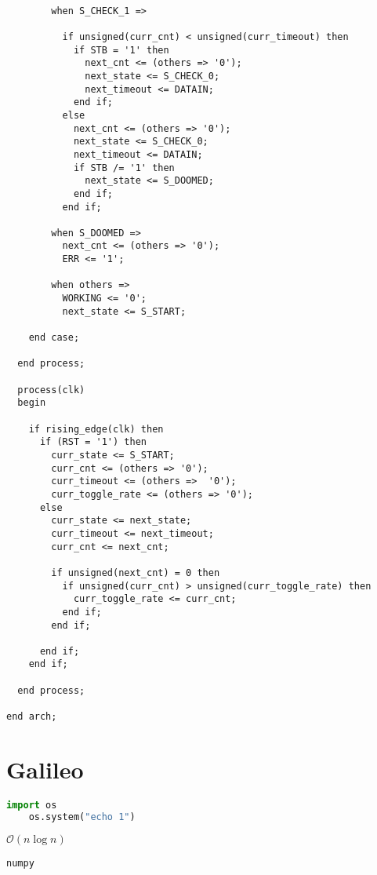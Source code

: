 \begin{lstlisting}[style=vhdl]
  
        when S_CHECK_1 =>
  
          if unsigned(curr_cnt) < unsigned(curr_timeout) then
            if STB = '1' then
              next_cnt <= (others => '0');
              next_state <= S_CHECK_0;
              next_timeout <= DATAIN;
            end if;
          else
            next_cnt <= (others => '0');
            next_state <= S_CHECK_0;
            next_timeout <= DATAIN;
            if STB /= '1' then
              next_state <= S_DOOMED;
            end if;
          end if;
  
        when S_DOOMED =>
          next_cnt <= (others => '0');
          ERR <= '1';
  
        when others =>
          WORKING <= '0';
          next_state <= S_START;
  
    end case;
  
  end process;

  process(clk)
  begin

    if rising_edge(clk) then
      if (RST = '1') then
        curr_state <= S_START;
        curr_cnt <= (others => '0');
        curr_timeout <= (others =>  '0');
        curr_toggle_rate <= (others => '0');
      else
        curr_state <= next_state;
        curr_timeout <= next_timeout;
        curr_cnt <= next_cnt;

        if unsigned(next_cnt) = 0 then
          if unsigned(curr_cnt) > unsigned(curr_toggle_rate) then
            curr_toggle_rate <= curr_cnt;
          end if;
        end if;

      end if;
    end if;

  end process;

end arch;

\end{lstlisting}

\chapter{Galileo}
\label{sec:appendix_galileo}

\begin{lstlisting}[language=Python]
    import os
    os.system("echo 1")
\end{lstlisting}

$\mathcal{O}\left(n\log{n}\right)$

\verb+numpy+

